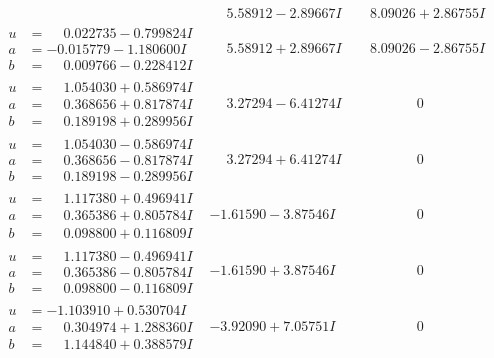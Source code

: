 \documentclass[1p]{elsarticle_modified}
\theoremstyle{definition}
\begin{document}
$$\begin{array}{c|c|c}
 & \phantom{-}5.58912 - 2.89667 I & \phantom{-}8.09026 + 2.86755 I \\ \hline\begin{aligned}
u &= \phantom{-}0.022735 - 0.799824 I \\
a &= -0.015779 - 1.180600 I \\
b &= \phantom{-}0.009766 - 0.228412 I\end{aligned}
 & \phantom{-}5.58912 + 2.89667 I & \phantom{-}8.09026 - 2.86755 I \\ \hline\begin{aligned}
u &= \phantom{-}1.054030 + 0.586974 I \\
a &= \phantom{-}0.368656 + 0.817874 I \\
b &= \phantom{-}0.189198 + 0.289956 I\end{aligned}
 & \phantom{-}3.27294 - 6.41274 I & \phantom{-0.000000 } 0 \\ \hline\begin{aligned}
u &= \phantom{-}1.054030 - 0.586974 I \\
a &= \phantom{-}0.368656 - 0.817874 I \\
b &= \phantom{-}0.189198 - 0.289956 I\end{aligned}
 & \phantom{-}3.27294 + 6.41274 I & \phantom{-0.000000 } 0 \\ \hline\begin{aligned}
u &= \phantom{-}1.117380 + 0.496941 I \\
a &= \phantom{-}0.365386 + 0.805784 I \\
b &= \phantom{-}0.098800 + 0.116809 I\end{aligned}
 & -1.61590 - 3.87546 I & \phantom{-0.000000 } 0 \\ \hline\begin{aligned}
u &= \phantom{-}1.117380 - 0.496941 I \\
a &= \phantom{-}0.365386 - 0.805784 I \\
b &= \phantom{-}0.098800 - 0.116809 I\end{aligned}
 & -1.61590 + 3.87546 I & \phantom{-0.000000 } 0 \\ \hline\begin{aligned}
u &= -1.103910 + 0.530704 I \\
a &= \phantom{-}0.304974 + 1.288360 I \\
b &= \phantom{-}1.144840 + 0.388579 I\end{aligned}
 & -3.92090 + 7.05751 I & \phantom{-0.000000 } 0 \\ \hline\begin{aligned}

\end{aligned}
\end{array}$$
\end{document}
